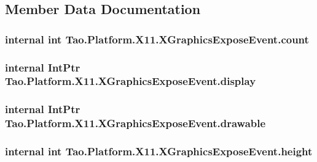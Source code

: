 \subsection{Member Data Documentation}
\hypertarget{struct_tao_1_1_platform_1_1_x11_1_1_x_graphics_expose_event_a756fcf445486d54e478c1be4007c0430}{
\subsubsection[{count}]{\setlength{\rightskip}{0pt plus 5cm}internal int {\bf Tao.Platform.X11.XGraphicsExposeEvent.count}}}
\label{struct_tao_1_1_platform_1_1_x11_1_1_x_graphics_expose_event_a756fcf445486d54e478c1be4007c0430}
\hypertarget{struct_tao_1_1_platform_1_1_x11_1_1_x_graphics_expose_event_a2b54307a6e955c03d5cb202c357ea546}{
\subsubsection[{display}]{\setlength{\rightskip}{0pt plus 5cm}internal IntPtr {\bf Tao.Platform.X11.XGraphicsExposeEvent.display}}}
\label{struct_tao_1_1_platform_1_1_x11_1_1_x_graphics_expose_event_a2b54307a6e955c03d5cb202c357ea546}
\hypertarget{struct_tao_1_1_platform_1_1_x11_1_1_x_graphics_expose_event_a8d168cda0f25d0f1a2ab749cc7a95d13}{
\subsubsection[{drawable}]{\setlength{\rightskip}{0pt plus 5cm}internal IntPtr {\bf Tao.Platform.X11.XGraphicsExposeEvent.drawable}}}
\label{struct_tao_1_1_platform_1_1_x11_1_1_x_graphics_expose_event_a8d168cda0f25d0f1a2ab749cc7a95d13}
\hypertarget{struct_tao_1_1_platform_1_1_x11_1_1_x_graphics_expose_event_acab3dcf0f2a4dfdc238df55420d910be}{
\subsubsection[{height}]{\setlength{\rightskip}{0pt plus 5cm}internal int {\bf Tao.Platform.X11.XGraphicsExposeEvent.height}}}
